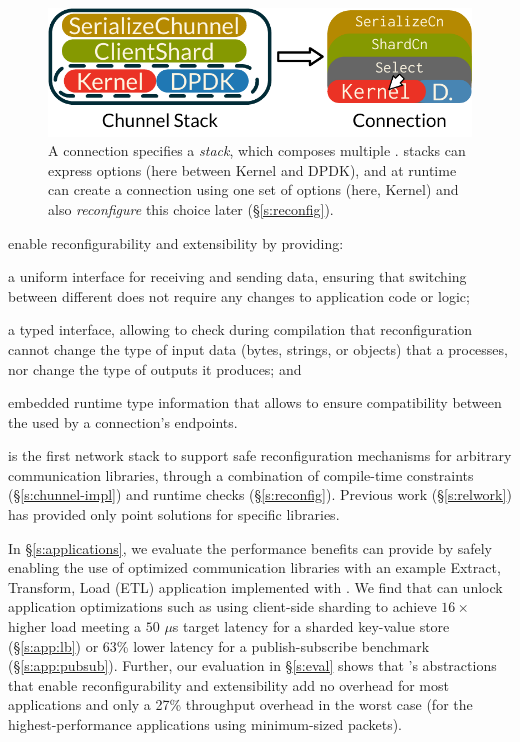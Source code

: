 \begin{figure}
    \centering
    \includegraphics[width=\columnwidth]{img/chunnel-basic}
    \vspace{0pt}
    \caption{A \name connection specifies a \emph{\tunnel stack}, which composes multiple \tunnels. \tunnel stacks can express options (\eg here between Kernel and DPDK), and at runtime \name can create a connection using one set of options (here, Kernel) and also \emph{reconfigure} this choice later (\S\ref{s:reconfig}).}
    \label{f:chunnel-basic}
\end{figure}

\tunnels enable reconfigurability and extensibility by providing:
\begin{inparaenum}[(a)]
    \item a uniform interface for receiving and sending data, ensuring that switching between different \tunnels does not require any changes to application code or logic;
     \item a typed interface, allowing \name to check during compilation that reconfiguration cannot change the type of input data (\eg bytes, strings, or objects) that a \tunnel processes, nor change the type of outputs it produces; and
     \item embedded runtime type information that allows \name to ensure compatibility between the \tunnels used by a connection's endpoints.
\end{inparaenum}

  \name is the first network stack to support safe reconfiguration mechanisms for arbitrary communication libraries, through a combination of compile-time constraints (\S\ref{s:chunnel-impl}) and runtime checks (\S\ref{s:reconfig}).
Previous work (\S\ref{s:relwork}) has provided only point solutions for specific libraries.

In \S\ref{s:applications}, we evaluate the performance benefits \name can provide by safely enabling the use of optimized communication libraries with an example Extract, Transform, Load (ETL) application implemented with \name.
We find that \name 
can unlock application optimizations such as using client-side sharding to achieve $16\times$ higher load meeting a $50$ $\mu$s target latency for a sharded key-value store (\S\ref{s:app:lb}) or 63\% lower latency for a publish-subscribe benchmark (\S\ref{s:app:pubsub}).
Further, our evaluation in \S\ref{s:eval} shows that \name's abstractions that enable reconfigurability and extensibility add no overhead for most applications and only a 27\% throughput overhead in the worst case (for the highest-performance applications using minimum-sized packets).
